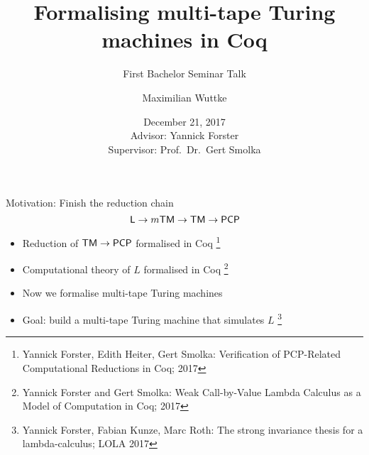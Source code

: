


\renewcommand{\Type}{\mathbb{T}}
\renewcommand{\Nat}{\mathbb{N}}
\renewcommand{\Bool}{\mathbb{B}}
\renewcommand{\Option}{\mathcal{O}}
\renewcommand{\List}{\mathcal{L}}
\newcommand{\Pow}{\mathcal{P}}

\beamertemplatenavigationsymbolsempty%

\newcommand\refs[1]{%
  \begin{textblock*}{8cm}(0.3cm,9.0cm)%
    \scriptsize {\color{gray}#1}
  \end{textblock*}
}


\title{Formalising multi-tape Turing machines in Coq}
\subtitle{First Bachelor Seminar Talk}
\author{Maximilian Wuttke}
\date{December 21, 2017\\
  \bigskip{}
  \bigskip{}
  {
    \tiny
    Advisor: Yannick Forster\\
    Supervisor: Prof.\ Dr.\ Gert Smolka%
  }
}


% 



\frame{\titlepage}

\begin{frame}{Motivation: Finish the reduction chain}
  \[\textsf{L} \rightarrow m\textsf{TM} \rightarrow \textsf{TM} \rightarrow \textsf{PCP}\]

  \begin{itemize}
    \pause\item Reduction of $\textsf{TM} \rightarrow \textsf{PCP}$ formalised in Coq%
    \footnote{\tiny Yannick Forster, Edith Heiter, Gert Smolka: Verification of PCP-Related Computational Reductions in Coq; 2017}
    \pause\item Computational theory of $L$ formalised in Coq%
    \footnote{\tiny Yannick Forster and Gert Smolka: Weak Call-by-Value Lambda Calculus as a Model of Computation in Coq; 2017}
    \pause\item Now we formalise multi-tape Turing machines%
    \pause\item Goal: build a multi-tape Turing machine that simulates $L$%
    \footnote{\tiny Yannick Forster, Fabian Kunze, Marc Roth: The strong invariance thesis for a lambda-calculus; LOLA 2017}%
\end{itemize}
\end{frame}

